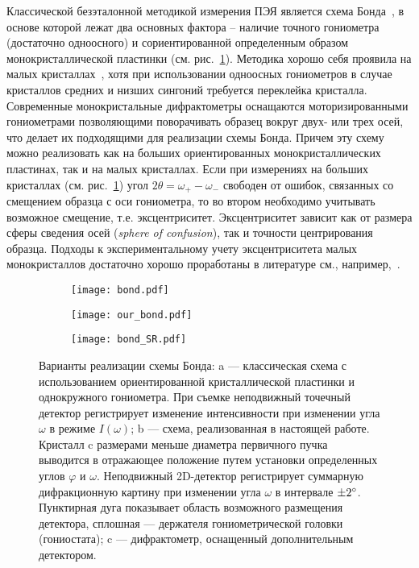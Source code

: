 Классической безэталонной методикой измерения ПЭЯ является схема Бонда~\cite{Bond:1960}, в основе которой лежат два основных фактора – наличие точного гониометра (достаточно одноосного) и сориентированной определенным образом монокристаллической пластинки (см. рис.~\ref{fig:bond}).
Методика хорошо себя проявила на малых кристаллах~\cite{Lisoivan:1988}, хотя при использовании одноосных гониометров в случае кристаллов средних и низших сингоний требуется переклейка кристалла.
Современные монокристальные дифрактометры оснащаются моторизированными гониометрами позволяющими поворачивать образец вокруг двух- или трех осей, что делает их подходящими для реализации схемы Бонда.
Причем эту схему можно реализовать как на больших ориентированных монокристаллических пластинах, так и на малых кристаллах.
Если при измерениях на больших кристаллах (см. рис.~\ref{fig:bond}) угол $2\theta = \omega_+ - \omega_-$ свободен от ошибок, связанных со смещением образца с оси гониометра, то во втором необходимо учитывать возможное смещение, т.е. эксцентриситет.
Эксцентриситет зависит как от размера сферы сведения осей (\textit{sphere of confusion}), так и точности центрирования образца.
Подходы к экспериментальному учету эксцентриситета малых монокристаллов достаточно хорошо проработаны в литературе см., например,~\cite{Ponomarev:1969,King:1979}.

\begin{figure}[ht!]
    \centering
    \begin{subfigure}{0.5\textwidth}
    \centering
    \texttt{[image: bond.pdf]}
    \caption{}%
    \label{fig:bond}
    \end{subfigure}%
    \begin{subfigure}{0.5\textwidth}
    \centering
    \texttt{[image: our\_bond.pdf]}
    \caption{}%
    \label{fig:our_bond}
    \end{subfigure}
    \begin{subfigure}{\textwidth}
    \centering
    \texttt{[image: bond\_SR.pdf]}
    \caption{}%
    \label{fig:bond_SR}
    \end{subfigure}
    \caption{
        Варианты реализации схемы Бонда: a --- классическая схема с использованием ориентированной кристаллической пластинки и однокружного гониометра.
        При съемке неподвижный точечный детектор регистрирует изменение интенсивности при изменении угла $\omega$ в режиме $I(\omega)$;
        b --- схема, реализованная в настоящей работе.
        Кристалл c размерами меньше диаметра первичного пучка выводится в отражающее положение путем установки определенных углов $\varphi$ и $\omega$.
        Неподвижный 2D-детектор регистрирует суммарную дифракционную картину при изменении угла $\omega$ в интервале $\pm 2^\circ$.
        Пунктирная дуга показывает область возможного размещения детектора, сплошная --- держателя гониометрической головки (гониостата);
        c --- дифрактометр, оснащенный дополнительным детектором.
    }%
\end{figure}

